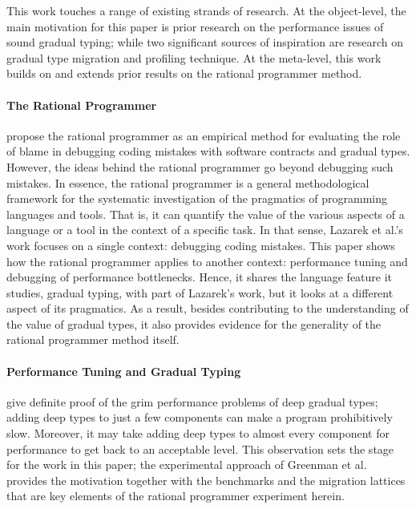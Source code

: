 

This work touches a range of existing strands of research. At
the object-level, the main motivation for this paper is prior research on
the performance issues of sound gradual typing; while two significant
sources of inspiration are research on gradual type migration and
profiling technique.  At the meta-level, this work builds on and extends
prior results on the rational programmer method.   

\paragraph{The Rational Programmer}

 \citet{lksfd-popl-2020,lgfd-icfp-2021} propose the rational programmer as
 an empirical method for evaluating the role of blame in debugging coding
 mistakes with software contracts and gradual types. However, the ideas
 behind the rational programmer go beyond debugging such mistakes. In
 essence, the rational programmer is a general methodological framework
 for the systematic investigation of the pragmatics of programming
 languages and tools. That is, it can quantify the value of the various
 aspects of a language or a tool in the context of a specific task. In
 that sense, Lazarek et al.'s work focuses on a single context: debugging
 coding mistakes. This paper shows how the rational programmer applies
 to another context: performance tuning and debugging of performance
 bottlenecks. Hence, it shares the language feature it studies, gradual
 typing, with part of Lazarek's work, but it looks at a different aspect
 of its pragmatics. As a result, besides contributing to the understanding
 of the value of gradual types, it also provides evidence for the
 generality of the rational programmer method itself.  

\paragraph{Performance Tuning and Gradual Typing} 

\citet{gtnffvf-jfp-2019} give definite proof of the grim performance
problems of deep gradual types; adding deep types to just a few components
can make a program prohibitively slow. Moreover, it may take adding deep
types to almost every component for performance to get back to an
acceptable level. This observation sets the stage for the work in this
paper; the experimental approach of Greenman et al. provides the
motivation together with the benchmarks and the migration lattices that
are key elements of the rational programmer experiment herein.  

